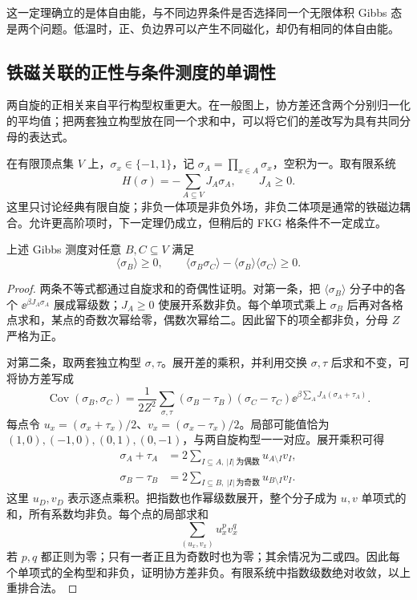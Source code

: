 这一定理确立的是体自由能，与不同边界条件是否选择同一个无限体积 Gibbs 态是两个问题。低温时，正、负边界可以产生不同磁化，却仍有相同的体自由能。

\subsection{铁磁关联的正性与条件测度的单调性}

两自旋的正相关来自平行构型权重更大。在一般图上，协方差还含两个分别归一化的平均值；把两套独立构型放在同一个求和中，可以将它们的差改写为具有共同分母的表达式。

\begin{definition}[自旋乘积与铁磁耦合]
在有限顶点集 $V$ 上，$\sigma_x\in\{-1,1\}$，记 $\sigma_A=\prod_{x\in A}\sigma_x$，空积为一。取有限系统
\[
 H(\sigma)=-\sum_{A\subseteq V}J_A\sigma_A,\qquad J_A\ge0.
\]
这里只讨论经典有限自旋；非负一体项是非负外场，非负二体项是通常的铁磁边耦合。允许更高阶项时，下一定理仍成立，但稍后的 FKG 格条件不一定成立。
\end{definition}

\begin{theorem}
上述 Gibbs 测度对任意 $B,C\subseteq V$ 满足
\begin{equation}
 \langle\sigma_B\rangle\ge0,\qquad
 \langle\sigma_B\sigma_C\rangle-
 \langle\sigma_B\rangle\langle\sigma_C\rangle\ge0.
 \label{eq:phys-sm-griffiths-inequalities}
\end{equation}
\end{theorem}
\begin{proof}
两条不等式都通过自旋求和的奇偶性证明。对第一条，把 $\langle\sigma_B\rangle$ 分子中的各个 $\ee^{\beta J_A\sigma_A}$ 展成幂级数；$J_A\ge0$ 使展开系数非负。每个单项式乘上 $\sigma_B$ 后再对各格点求和，某点的奇数次幂给零，偶数次幂给二。因此留下的项全都非负，分母 $Z$ 严格为正。

对第二条，取两套独立构型 $\sigma,\tau$。展开差的乘积，并利用交换 $\sigma,\tau$ 后求和不变，可将协方差写成
\[
 \operatorname{Cov}(\sigma_B,\sigma_C)
 =\frac1{2Z^2}\sum_{\sigma,\tau}
 (\sigma_B-\tau_B)(\sigma_C-\tau_C)
 \ee^{\beta\sum_AJ_A(\sigma_A+\tau_A)}.
\]
每点令 $u_x=(\sigma_x+\tau_x)/2$、$v_x=(\sigma_x-\tau_x)/2$。局部可能值恰为 $(1,0),(-1,0),(0,1),(0,-1)$，与两自旋构型一一对应。展开乘积可得
\begin{align*}
 \sigma_A+\tau_A&=2\sum_{I\subseteq A,\ |I|\ \text{为偶数}}u_{A\setminus I}v_I,\\
 \sigma_B-\tau_B&=2\sum_{I\subseteq B,\ |I|\ \text{为奇数}}u_{B\setminus I}v_I.
\end{align*}
这里 $u_D,v_D$ 表示逐点乘积。把指数也作幂级数展开，整个分子成为 $u,v$ 单项式的和，所有系数均非负。每个点的局部求和
\[
 \sum_{(u_x,v_x)}u_x^p v_x^q
\]
若 $p,q$ 都正则为零；只有一者正且为奇数时也为零；其余情况为二或四。因此每个单项式的全构型和非负，证明协方差非负。有限系统中指数级数绝对收敛，以上重排合法。
\end{proof}

